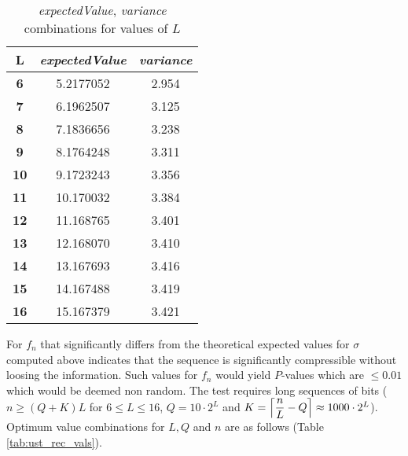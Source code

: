 \begin{enumerate}
    \begin{table}[h!]
        \centering
        \begin{tabular}{|c|c|c|}
            \hline
            \textbf{L} & \textbf{\textit{expectedValue}} & \textbf{\textit{variance}} \\ \hline
            \textbf{6} & 5.2177052 & 2.954 \\ \hline
            \textbf{7} & 6.1962507 & 3.125 \\ \hline
            \textbf{8} & 7.1836656 & 3.238 \\ \hline
            \textbf{9} & 8.1764248 & 3.311 \\ \hline
            \textbf{10} & 9.1723243 & 3.356 \\ \hline
            \textbf{11} & 10.170032 & 3.384 \\ \hline
            \textbf{12} & 11.168765 & 3.401 \\ \hline
            \textbf{13} & 12.168070 & 3.410 \\ \hline
            \textbf{14} & 13.167693 & 3.416 \\ \hline
            \textbf{15} & 14.167488 & 3.419 \\ \hline
            \textbf{16} & 15.167379 & 3.421 \\ \hline
        \end{tabular}
        \caption{\textit{expectedValue}, \textit{variance} combinations for values of $L$}
        \label{tab:ust_exval_var}
    \end{table}
\end{enumerate}

For $f_n$ that significantly differs from the theoretical expected values for $\sigma$ computed above indicates that the sequence is significantly compressible without loosing the information. Such values for $f_n$ would yield $P$-values which are $\leq0.01$ which would be deemed non random. The test requires long sequences of bits ($n\geq(Q+K)L$ for $6\leq L \leq16$, $Q=10\cdot2^L$ and $K=\ceil*{\dfrac{n}{L}-Q}\approx1000\cdot2^L$). Optimum value combinations for $L,Q$ and $n$ are as follows (Table \ref{tab:ust_rec_vals}).

